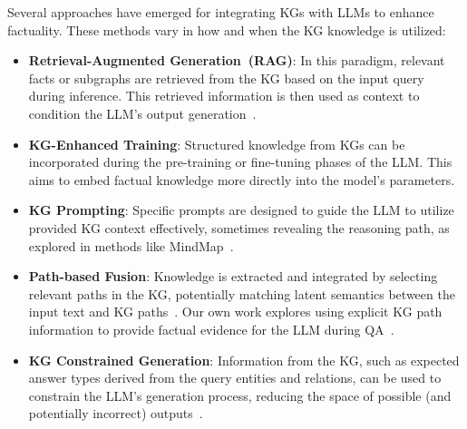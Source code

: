 Several approaches have emerged for integrating KGs with LLMs to enhance factuality. These methods vary in how and when the KG knowledge is utilized:
\begin{itemize}
    \item \textbf{Retrieval-Augmented Generation~(RAG)}: In this paradigm, relevant facts or subgraphs are retrieved from the KG based on the input query during inference. This retrieved information is then used as context to condition the LLM's output generation~\cite{DBLP:conf/nips/LewisPPPKGKLYR020-rag}.
    \item \textbf{KG-Enhanced Training}: Structured knowledge from KGs can be incorporated during the pre-training or fine-tuning phases of the LLM. This aims to embed factual knowledge more directly into the model's parameters.
    \item \textbf{KG Prompting}: Specific prompts are designed to guide the LLM to utilize provided KG context effectively, sometimes revealing the reasoning path, as explored in methods like MindMap~\cite{wen-etal-2024-mindmap}.
    \item \textbf{Path-based Fusion}: Knowledge is extracted and integrated by selecting relevant paths in the KG, potentially matching latent semantics between the input text and KG paths~\cite{liu-etal-2024-knowledge-graph}. Our own work explores using explicit KG path information to provide factual evidence for the LLM during QA~\cite{DBLP:journals/corr/abs-2310-02166}.
    \item \textbf{KG Constrained Generation}: Information from the KG, such as expected answer types derived from the query entities and relations, can be used to constrain the LLM's generation process, reducing the space of possible (and potentially incorrect) outputs~\cite{DBLP:journals/corr/abs-2310-07008}.
\end{itemize}

